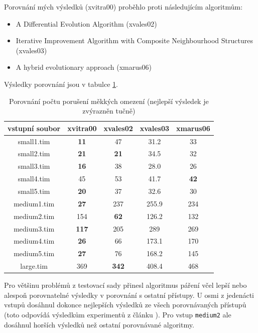 \documentclass[12pt, a4paper]{article}
\begin{document}
Porovnání mých výsledků (xvitra00) proběhlo proti následujícím algoritmům:
\begin{itemize}
  \item A Differential Evolution Algorithm (xvales02)
  \item Iterative Improvement Algorithm with Composite Neighbourhood Structures (xvales03)
  \item A hybrid evolutionary approach (xmarus06)
\end{itemize}
Výsledky porovnání jsou v tabulce \ref{tab:comp}.

\begin{table}[H]
\centering
\begin{tabular}{| c | c | c | c | c |}
\hline
vstupní soubor & \textbf{xvitra00} & \textbf{xvales02} & \textbf{xvales03} & \textbf{xmarus06} \\ \hline 
small1.tim & \textbf{11} & 47 & 31.2 & 33 \\ \hline
small2.tim & \textbf{21} & \textbf{21} & 34.5 & 32 \\ \hline
small3.tim & \textbf{16} & 38 & 28.0 & 26 \\ \hline
small4.tim & 45 & 53 & 41.7 & \textbf{42} \\ \hline
small5.tim & \textbf{20} & 37 & 32.6 & 30 \\ \hline
medium1.tim & \textbf{27} & 237 & 255.9 & 234 \\ \hline
medium2.tim & 154 & \textbf{62} & 126.2 & 132 \\ \hline
medium3.tim & \textbf{117} & 205 & 289 & 269 \\ \hline
medium4.tim & \textbf{26} & 66 & 173.1 & 170 \\ \hline
medium5.tim & \textbf{27} & 76 & 168.2 & 145 \\ \hline
large.tim & 369 & \textbf{342} & 408.4 & 468 \\ \hline
\end{tabular}
\caption{Porovnání počtu porušení měkkých omezení (nejlepší výsledek je zvýrazněn tučně)}
\label{tab:comp}
\end{table}

Pro většinu problémů z testovací sady přinesl algoritmus páření včel lepší nebo alespoň porovnatelné výsledky v porovnání s ostatní přístupy.
U osmi z jedenácti vstupů dosáhnul dokonce nejlepších výsledků ze všech porovnávaných přístupů (toto odpovídá výsledkům experimentů z článku \cite{HoneyBee}).
Pro vstup \texttt{medium2} ale dosáhnul horších výsledků než ostatní porovnávané algoritmy.
\end{document}
